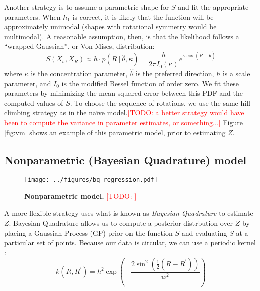 \documentclass{article} %
\newcommand{\TODO}[1]{\textcolor{red}{[TODO: #1]}}
\begin{document}
Another strategy is to assume a parametric shape for $S$ and fit the
appropriate parameters. When $h_1$ is correct, it is likely that the
function will be approximately unimodal (shapes with rotational
symmetry would be multimodal). A reasonable assumption, then, is that
the likelihood follows a ``wrapped Gaussian'', or Von Mises,
distribution:
\begin{equation}
  S(X_b, X_R) \approx h\cdot{}p(R\ \vert\ \hat{\theta}, \kappa)=\frac{h}{2\pi I_0(\kappa)}e^{\kappa\cos(R-\hat{\theta})}
\end{equation}
where $\kappa$ is the concentration parameter, $\hat{\theta}$ is the
preferred direction, $h$ is a scale parameter, and $I_0$ is the
modified Bessel function of order zero. We fit these parameters by
minimizing the mean squared error between this PDF and the computed
values of $S$. To choose the sequence of rotations, we use the same
hill-climbing strategy as in the na\"ive model.\TODO{a better strategy
  would have been to compute the variance in parameter estimates, or
  something...} Figure \ref{fig:vm} shows an example of this
parametric model, prior to estimating $Z$.

\subsection{Nonparametric (Bayesian Quadrature) model}

\begin{figure}[t]
  \centering
  \texttt{[image: ../figures/bq\_regression.pdf]}
  \caption{\textbf{Nonparametric model.} \TODO{}}
  \label{fig:bq}
\end{figure}

A more flexible strategy uses what is known as \emph{Bayesian
  Quadrature} \cite{Diaconis:1988uo,OHagan:1991tx} to estimate $Z$.
Bayesian Quadrature allows us to compute a posterior distrbution over
$Z$ by placing a Gaussian Process (GP) prior on the function $S$ and
evaluating $S$ at a particular set of points. Because our data is
circular, we can use a periodic kernel \cite{Rasmussen:2006vz}:
\begin{equation}
k(R, R^\prime)=h^2\exp\left(-\frac{2\sin^2\left(\frac{1}{2}(R-R^\prime)\right)}{w^2}\right)
\end{equation}
\end{document}
